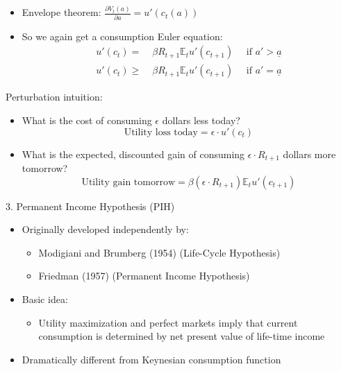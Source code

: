 \documentclass[11pt, aspectratio=169]{beamer}
\begin{document}
\begin{frame}{}
\begin{itemize}
\item Envelope theorem: $\frac{\partial V_t(a)}{\partial a} = u'(c_t(a))$

\item So we again get a consumption Euler equation:
\begin{align*}
	u'(c_t) = &\; \beta R_{t+1} \mathbb{E}_t u'(c_{t+1}) \quad \text{ if }  a' > \underline a \\
	u'(c_t) \geq &\; \beta R_{t+1} \mathbb{E}_t u'(c_{t+1})  \quad \text{ if }  a' = \underline a
\end{align*}
\end{itemize}


\vspace{6mm}
Perturbation intuition:
\begin{itemize}
\item What is the cost of consuming $\epsilon$ dollars less today? 
\begin{equation*}
	\text{Utility loss today} = \epsilon \cdot u'(c_t)
\end{equation*}

\item What is the expected, discounted gain of consuming $\epsilon \cdot R_{t+1}$ dollars more tomorrow?
\begin{equation*}
	\text{Utility gain tomorrow} = \beta (\epsilon \cdot R_{t+1}) \mathbb{E}_t u'(c_{t+1})
\end{equation*}
\end{itemize}

\end{frame}



\begin{frame}{3. Permanent Income Hypothesis (PIH)}
\begin{itemize}
	\itemsep1em 
	\item Originally developed independently by:
	\begin{itemize}
		\item Modigiani and Brumberg (1954) (Life-Cycle Hypothesis)
		\item Friedman (1957) (Permanent Income Hypothesis)
	\end{itemize}
	\item Basic idea:
	\begin{itemize}
		\item Utility maximization and perfect markets imply that current \\ consumption is determined by net present value of life-time income
	\end{itemize}
	\item Dramatically different from Keynesian consumption function
\end{itemize}
\end{frame}
\end{document}
